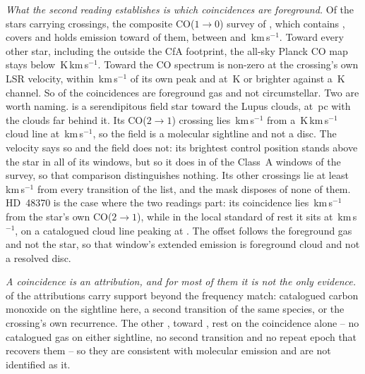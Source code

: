 \emph{What the second reading establishes is which coincidences are
foreground.} Of the \LsNLos{} stars carrying crossings, the composite
CO($1\to0$) survey of \citet{DameThaddeus2022}, which contains
\citet{Dame2001}, covers \LsNLosCov{} and holds emission toward \LsNLosDet{}
of them, between \LsCoVLo{} and \LsCoVHi\,km\,s$^{-1}$. Toward every other
star, including the \LsNLosOut{} outside the CfA footprint, the all-sky
Planck CO map \citep{PlanckCO2016} stays below
\LsPlanckMax\,K\,km\,s$^{-1}$. Toward
\LsCloudStars{} the CO spectrum is non-zero at the crossing's own LSR
velocity, within \LsCloudDvMax\,km\,s$^{-1}$ of its own peak and at
\LsCloudTMin\,K or brighter against a \LsCoRms\,K channel. So \LsNCloud{} of
the \MkNCoinc{} coincidences are foreground gas and not circumstellar.
Two are worth naming. \BkAlmaName{} is a serendipitous field star toward the
Lupus clouds, at \BkAlmaDistPc\,pc with the clouds far behind it. Its
CO($2\to1$) crossing lies \LsLupDv\,km\,s$^{-1}$ from a
\LsLupWco\,K\,km\,s$^{-1}$ cloud line at \LsLupVco\,km\,s$^{-1}$, so the
field is a molecular sightline and not a disc. The velocity says so and the
field
does not: its brightest control position stands above the star in all
\LsLupNRingLeadWord{} of its windows, but so it does in \LsRingLeadA{} of the
\NWinA{} Class~A windows of the survey, so that comparison
distinguishes nothing. Its other
\LsLupNFar{} crossings lie at least \LsLupFarMin\,km\,s$^{-1}$ from every
transition of the list, and the mask disposes of none of them. HD~48370 is
the case where the two readings part: its coincidence lies
\LsHdDvStar\,km\,s$^{-1}$ from the star's own CO($2\to1$), while in the local
standard of rest it sits at \LsHdVfeat\,km\,s$^{-1}$, on a catalogued cloud
line peaking at \LsHdVco. The offset follows the foreground gas and not the
star, so that window's extended emission is foreground cloud and not a
resolved disc.

\emph{A coincidence is an attribution, and for most of them it is not the
only evidence.} \LnAttrSupp{} of the \MkAttr{} attributions carry support
beyond the frequency match: catalogued carbon monoxide on the sightline here,
a second transition of the same species, or the crossing's own recurrence.
The other \LnAttrCoincWord, toward \LnCoincStars, rest on the coincidence
alone -- no catalogued gas on either sightline, no second transition and no
repeat epoch that recovers them -- so they are consistent with molecular
emission and are not identified as it.


\begin{table}
\centering
\footnotesize
\caption{The line mask, by species: the number of transitions $N$ it holds,
the frequency range they span inside the searched intervals and their
upper-state energies. Hydrogen recombination lines carry no tabulated
$E_{\rm u}$.}
\label{tab:masklines}

\end{table}

